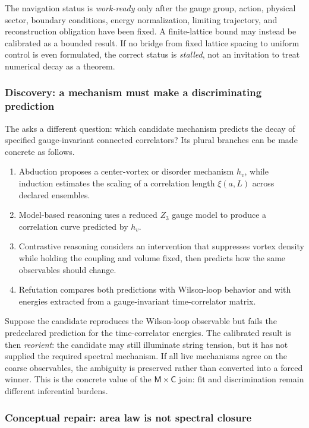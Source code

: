 The navigation status is \emph{work-ready} only after the gauge group, action,
physical sector, boundary conditions, energy normalization, limiting
trajectory, and reconstruction obligation have been fixed. A finite-lattice
bound may instead be calibrated as a bounded result. If no bridge from fixed
lattice spacing to uniform control is even formulated, the correct status is
\emph{stalled}, not an invitation to treat numerical decay as a theorem.

\subsubsection{Discovery: a mechanism must make a discriminating prediction}

The  asks a different question: which candidate
mechanism predicts the decay of specified gauge-invariant connected
correlators? Its plural branches can be made concrete as follows.

\begin{enumerate}[leftmargin=*,itemsep=0.35em]
\item Abduction proposes a center-vortex or disorder mechanism $h_v$, while
  induction estimates the scaling of a correlation length $\xi(a,L)$ across
  declared ensembles.
\item Model-based reasoning uses a reduced $Z_3$ gauge model to produce a
  correlation curve predicted by $h_v$.
\item Contrastive reasoning considers an intervention that suppresses vortex
  density while holding the coupling and volume fixed, then predicts how the
  same observables should change.
\item Refutation compares both predictions with Wilson-loop behavior and with
  energies extracted from a gauge-invariant time-correlator matrix.
\end{enumerate}

Suppose the candidate reproduces the Wilson-loop observable but fails the
predeclared prediction for the time-correlator energies. The calibrated result
is then \emph{reorient}: the candidate may still illuminate string tension, but
it has not supplied the required spectral mechanism. If all live mechanisms
agree on the coarse observables, the ambiguity is preserved rather than
converted into a forced winner. This is the concrete value of the
$\mathsf{M}\times\mathsf{C}$ join: fit and discrimination remain different
inferential burdens.

\subsubsection{Conceptual repair: area law is not spectral closure}


